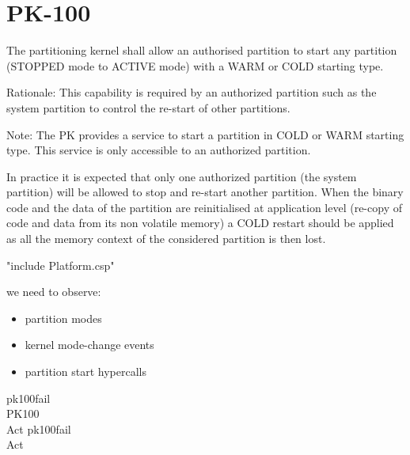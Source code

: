 \section{PK-100}


The partitioning kernel shall allow an authorised partition
to start any partition (STOPPED mode to ACTIVE mode)
with a WARM or COLD starting type.

Rationale: This capability is required by an authorized partition such as the
system partition to control the re-start of other partitions.

Note: The PK provides a service to start a partition in COLD or WARM starting
type. This service is only accessible to an authorized partition.

In practice it is expected that only one authorized partition (the system
partition) will be allowed to stop and re-start another partition. When the
binary code and the data of the partition are reinitialised at application
level (re-copy of code and data from its non volatile memory) a COLD restart
should be applied as all the memory context of the considered partition is
then lost.

\begin{assert}
"include Platform.csp"
\end{assert}

 we need to observe:
 \begin{itemize}
 \item partition modes
 \item kernel mode-change events
 \item partition start hypercalls
\end{itemize}
\begin{circus}
\circchannel pk100fail\\

\circprocess PK100 \circdef \circbegin\\
  Act \circdef pk100fail \then \Stop\\ %
  \circspot Act\\
\circend
\end{circus}
